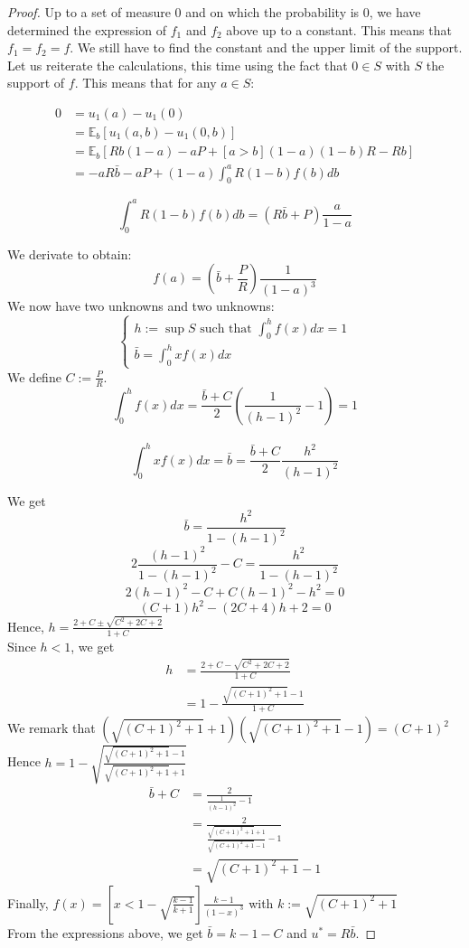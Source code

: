 \documentclass[preprint,12pt,authoryear]{elsarticle}
\theoremstyle{definition}
\begin{document}
\begin{proof}
Up to a set of measure 0 and on which the probability is 0, we have determined the expression of $f_1$ and $f_2$ above up to a constant. This means that $f_1 = f_2 = f$.
We still have to find the constant and the upper limit of the support.
Let us reiterate the calculations, this time using the fact that $0 \in S$ with $S$ the support of $f$. This means that for any $a\in S$:

\begin{align*}0 &= u_1(a) - u_1(0)\\
&= \mathbb{E}_b[u_1(a, b) - u_1(0, b)]\\
&= \mathbb{E}_b\left[Rb(1-a) - aP  + [a>b](1-a)(1-b)R - Rb \right]\\
&= -a R \bar b - a P + (1-a) \int_0^a R (1-b) f(b) db\end{align*}

$$\int_0^a R (1-b) f(b) db = (R \bar b + P) \frac{a}{1-a}$$

We derivate to obtain:
$$f(a) = \left(\bar b + \frac{P}{R}\right) \frac{1}{(1-a)^3}$$
We now have two unknowns and two unknowns:
$$
\left\{ \begin{array}{ll}
h := \sup S  \text{ such that } \int_0^h f(x) dx = 1\\
\bar b = \int_0^h x f(x) dx
\end{array} \right.
$$
We define $C := \frac{P}{R}$.\\
$$\int_0^h f(x) dx = \frac{\bar b + C}{2} \left(\frac{1}{(h-1)^2}-1\right) = 1$$\\
$$\int_0^h x f(x) dx = \bar b = \frac{\bar b + C}{2} \frac{h^2}{(h-1)^2}$$

We get
$$\bar b = \frac{h^2}{1-(h-1)^2}$$
$$2 \frac{(h-1)^2}{1 - (h-1)^2} - C = \frac{h^2}{1 - (h-1)^2}$$
$$2(h-1)^2 - C + C (h-1)^2 - h^2 = 0$$
$$(C + 1) h^2 - (2 C + 4) h + 2 = 0$$
Hence, $h = \frac{2 + C \pm \sqrt{C^2 + 2 C + 2}}{1 + C}$\\
Since $h<1$, we get
\begin{align*}
    h &= \frac{2 + C - \sqrt{C^2 + 2 C + 2}}{1 + C}\\
      &= 1 - \frac{\sqrt{(C + 1)^2 + 1} - 1}{1+C}
\end{align*}
We remark that $(\sqrt{(C + 1)^2 + 1} + 1)( \sqrt{(C + 1)^2 + 1} - 1) = (C+1)^2$\\
Hence $h = 1 - \sqrt{\frac{\sqrt{(C + 1)^2 + 1} - 1}{\sqrt{(C + 1)^2 + 1} + 1}}$
\begin{align*}\bar b + C &=\frac{2}{\frac{1}{(h-1)^2} - 1}\\
&= \frac{2}{\frac{\sqrt{(C + 1)^2 + 1} + 1}{\sqrt{(C + 1)^2 + 1} - 1} - 1}\\
&= \sqrt{(C + 1)^2 + 1} - 1\end{align*}
Finally, $f(x) = \left[x < 1 - \sqrt{\frac{k - 1}{k + 1}}\right] \frac{ k - 1}{(1-x)^3}$ with $k := \sqrt{(C + 1)^2 + 1}$\\
From the expressions above, we get $\bar b = k - 1 - C$ and $u^* = R \bar b$.
\end{proof}
\end{document}
